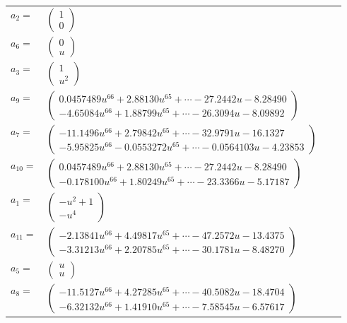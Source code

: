\documentclass[1p]{elsarticle_modified}
\theoremstyle{definition}
\begin{document}
\begin{tabular}{m{7pt} m{180pt} m{7pt} m{180pt} }
\flushright $a_{2}=$&$\begin{pmatrix}1\\0\end{pmatrix}$ \\
\flushright $a_{6}=$&$\begin{pmatrix}0\\u\end{pmatrix}$ \\
\flushright $a_{3}=$&$\begin{pmatrix}1\\u^2\end{pmatrix}$ \\
\flushright $a_{9}=$&$\begin{pmatrix}0.0457489 u^{66}+2.88130 u^{65}+\cdots-27.2442 u-8.28490\\-4.65084 u^{66}+1.88799 u^{65}+\cdots-26.3094 u-8.09892\end{pmatrix}$ \\
\flushright $a_{7}=$&$\begin{pmatrix}-11.1496 u^{66}+2.79842 u^{65}+\cdots-32.9791 u-16.1327\\-5.95825 u^{66}-0.0553272 u^{65}+\cdots-0.0564103 u-4.23853\end{pmatrix}$ \\
\flushright $a_{10}=$&$\begin{pmatrix}0.0457489 u^{66}+2.88130 u^{65}+\cdots-27.2442 u-8.28490\\-0.178100 u^{66}+1.80249 u^{65}+\cdots-23.3366 u-5.17187\end{pmatrix}$ \\
\flushright $a_{1}=$&$\begin{pmatrix}- u^2+1\\- u^4\end{pmatrix}$ \\
\flushright $a_{11}=$&$\begin{pmatrix}-2.13841 u^{66}+4.49817 u^{65}+\cdots-47.2572 u-13.4375\\-3.31213 u^{66}+2.20785 u^{65}+\cdots-30.1781 u-8.48270\end{pmatrix}$ \\
\flushright $a_{5}=$&$\begin{pmatrix}u\\u\end{pmatrix}$ \\
\flushright $a_{8}=$&$\begin{pmatrix}-11.5127 u^{66}+4.27285 u^{65}+\cdots-40.5082 u-18.4704\\-6.32132 u^{66}+1.41910 u^{65}+\cdots-7.58545 u-6.57617\end{pmatrix}$ \\

\end{tabular}
\end{document}
